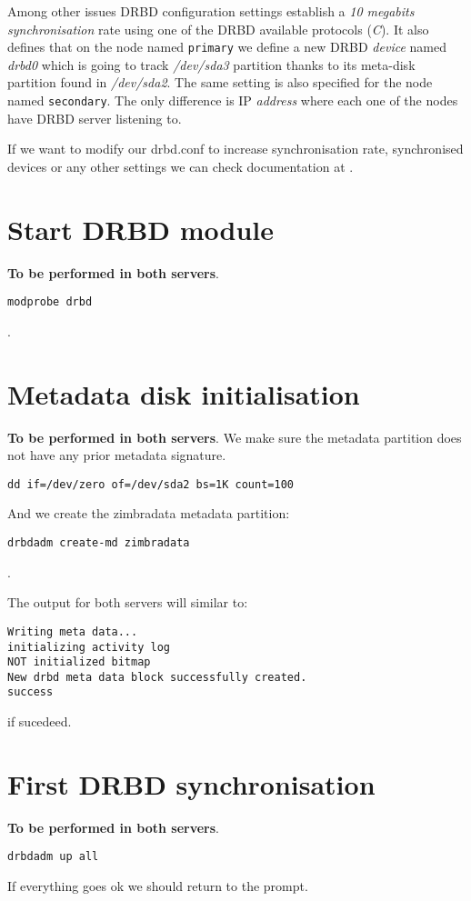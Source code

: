Among other issues DRBD configuration settings establish a \textit{10 megabits synchronisation} rate using one of the DRBD available protocols (\textit{C}). It also defines that on the node named {\tt primary} we define a new DRBD \textit{device} named \textit{drbd0} which is going to track \textit{/dev/sda3} partition thanks to its meta-disk partition found in \textit{/dev/sda2}. The same setting is also specified for the node named {\tt secondary}. The only difference is IP \textit{address} where each one of the nodes have DRBD server listening to.

If we want to modify our drbd.conf to increase synchronisation rate, synchronised devices or any other settings we can check documentation at \cite{LinbitDRBDdrbdconf}.

\section {Start DRBD module}
\textbf{To be performed in both servers}.
\begin{verbatim}
modprobe drbd
\end{verbatim}
.
\section {Metadata disk initialisation}
\textbf{To be performed in both servers}.
We make sure the metadata partition does not have any prior metadata signature.
\begin{verbatim}
dd if=/dev/zero of=/dev/sda2 bs=1K count=100
\end{verbatim}
And we create the zimbradata metadata partition:
\begin{verbatim}
drbdadm create-md zimbradata
\end{verbatim}
.

The output for both servers will similar to:
\begin{verbatim}
Writing meta data...
initializing activity log
NOT initialized bitmap
New drbd meta data block successfully created.
success
\end{verbatim}
if sucedeed.

\section {First DRBD synchronisation}
\textbf{To be performed in both servers}.
\begin{verbatim}
drbdadm up all
\end{verbatim}
If everything goes ok we should return to the prompt.

